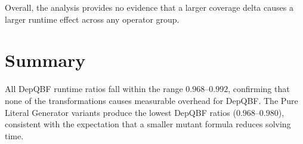 Overall, the analysis provides no evidence that a larger coverage delta
causes a larger runtime effect across any operator group.

\section{Summary}\label{sec:eval-summary}

\begin{table}[h]
\centering
\caption{Aggregated results per transformation operator (n = number of valid experiments; ratios and coverage deltas are medians across formulas).}
\label{tab:summary}
\end{table}

All DepQBF runtime ratios fall within the range $0.968$--$0.992$, confirming
that none of the transformations causes measurable overhead for DepQBF\@.
The Pure Literal Generator variants produce the lowest DepQBF ratios
($0.968$--$0.980$), consistent with the expectation that a smaller mutant
formula reduces solving time.

